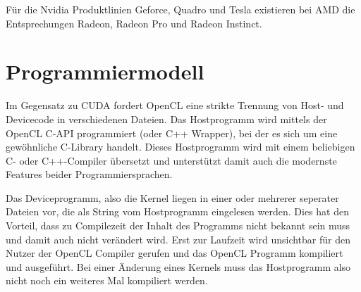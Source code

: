 	    	Für die Nvidia Produktlinien Geforce, Quadro und Tesla existieren bei AMD die Entsprechungen Radeon, Radeon Pro und Radeon Instinct. 
	    	
		\section{Programmiermodell}
		Im Gegensatz zu CUDA fordert OpenCL eine strikte Trennung von Host- und Devicecode in verschiedenen Dateien. Das Hostprogramm wird mittels der OpenCL C-\Gls{API} programmiert (oder C++ Wrapper), bei der es sich um eine gewöhnliche C-Library handelt. Dieses Hostprogramm wird mit einem beliebigen C- oder C++-Compiler übersetzt und unterstützt damit auch die modernste Features beider Programmiersprachen.
		
		Das Deviceprogramm, also die \Gls{Kernel} liegen in einer oder mehrerer seperater Dateien vor, die als String vom Hostprogramm eingelesen werden. Dies hat den Vorteil, dass zu Compilezeit der Inhalt des Programms nicht bekannt sein muss und damit auch nicht verändert wird. Erst zur Laufzeit wird unsichtbar für den Nutzer der OpenCL Compiler gerufen und das OpenCL Programm kompiliert und ausgeführt. Bei einer Änderung eines \Glspl{Kernel} muss das Hostprogramm also nicht noch ein weiteres Mal kompiliert werden.
		
